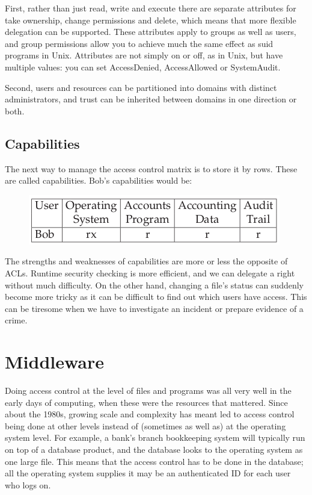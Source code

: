 			First, rather than just read, write and execute there are separate attributes for
			take ownership, change permissions and delete, which means that more flexible
			delegation can be supported. These attributes apply to groups as well as users,
			and group permissions allow you to achieve much the same effect as suid
			programs in Unix. Attributes are not simply on or off, as in Unix, but have
			multiple values: you can set AccessDenied, AccessAllowed or SystemAudit. 

			Second, users and resources can be partitioned into domains with distinct
			administrators, and trust can be inherited between domains in one direction
			or both. 

		\clearpage
		\subsection{Capabilities}
			The next way to manage the access control matrix is to store it by rows. These
			are called capabilities. Bob’s capabilities would be:

			\begin{figure}[H]
				\includegraphics[scale=0.6]{pics/capabilities.png}
			\end{figure}

		The strengths and weaknesses of capabilities are more or less the opposite
		of ACLs. Runtime security checking is more efficient, and we can delegate a
		right without much difficulty. On the other hand, changing a file’s status can 
		suddenly become more tricky as it can be difficult to find out which users 
		have access. This can be tiresome when we have to investigate an incident 
		or prepare evidence of a crime.

	\section{Middleware}
		Doing access control at the level of files and programs was all very well in the
		early days of computing, when these were the resources that mattered. Since
		about the 1980s, growing scale and complexity has meant led to access control
		being done at other levels instead of (sometimes as well as) at the operating
		system level. For example, a bank’s branch bookkeeping system will typically
		run on top of a database product, and the database looks to the operating
		system as one large file. This means that the access control has to be done in
		the database; all the operating system supplies it may be an authenticated ID
		for each user who logs on.

